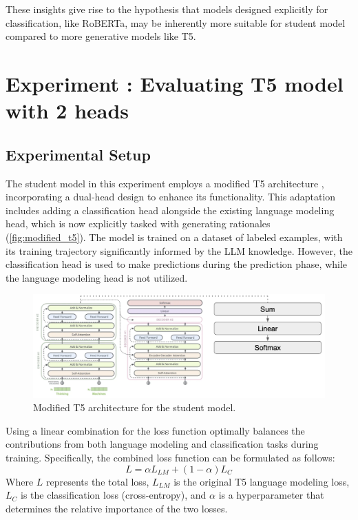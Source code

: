 These insights give rise to the hypothesis that models designed explicitly for classification, like RoBERTa, may be inherently more suitable for student model compared to more generative models like T5.

\section{Experiment \theexperiment: Evaluating T5 model with 2 heads}
\label{sec:t5_2heads}

\subsection*{Experimental Setup}

The student model in this experiment employs a modified T5 architecture \cite{t5}, incorporating a dual-head design to enhance its functionality. This adaptation includes adding a classification head alongside the existing language modeling head, which is now explicitly tasked with generating rationales (\autoref{fig:modified_t5}). The model is trained on a dataset of labeled examples, with its training trajectory significantly informed by the LLM knowledge. However, the classification head is used to make predictions during the prediction phase, while the language modeling head is not utilized.

\begin{figure}[hbt]
    \centering
    \includegraphics[width=0.99\linewidth]{figs/modified_t5.png}
    \caption{Modified T5 architecture for the student model.}
    \label{fig:modified_t5}
\end{figure}

Using a linear combination for the loss function optimally balances the contributions from both language modeling and classification tasks during training. Specifically, the combined loss function can be formulated as follows:
$$ L = \alpha L_{LM} + (1 - \alpha) L_{C} $$
Where $L$ represents the total loss, $L_{LM}$ is the original T5 language modeling loss, $L_{C}$ is the classification loss (cross-entropy), and $\alpha$ is a hyperparameter that determines the relative importance of the two losses.

